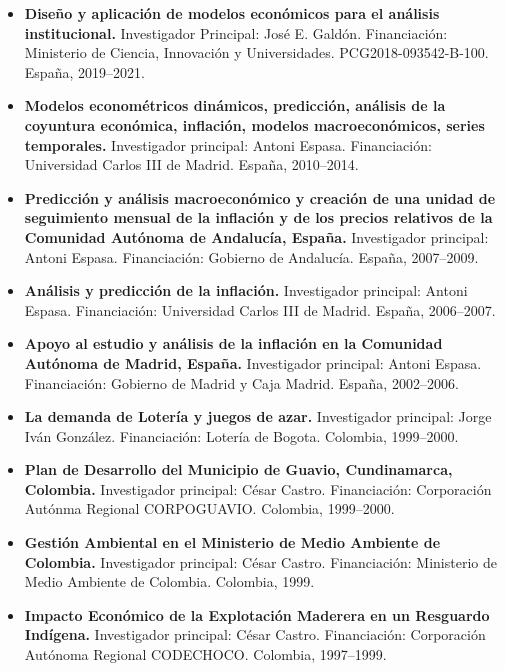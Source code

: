 \documentclass[11pt]{article}\usepackage[]{graphicx}\usepackage[]{color}
\begin{document}
\begin{itemize}
  \item \textbf{Diseño y aplicación de modelos económicos para el análisis institucional.} Investigador Principal: José E. Galdón. Financiación: Ministerio de Ciencia, Innovación y Universidades. PCG2018-093542-B-100. España, 2019--2021.
  
\item \textbf{Modelos econométricos dinámicos, predicción, análisis de la
coyuntura económica, inflación, modelos macroeconómicos, series temporales.} Investigador principal: Antoni Espasa. Financiación: Universidad Carlos III de Madrid. España, 2010--2014.

\item \textbf{Predicción y análisis macroeconómico y creación de una unidad de seguimiento mensual de la inflación y de los precios relativos de la Comunidad Autónoma de Andalucía, España.} Investigador principal: Antoni Espasa. Financiación: Gobierno de Andalucía. España, 2007--2009.

\item \textbf{Análisis y predicción de la inflación.} Investigador principal: Antoni Espasa. Financiación: Universidad Carlos III de Madrid. España, 2006--2007.

\item \textbf{Apoyo al estudio y análisis de la inflación en la Comunidad 
Autónoma de Madrid, España.} Investigador principal: Antoni Espasa. Financiación: Gobierno de Madrid y Caja Madrid. España, 2002--2006.

\item \textbf{La demanda de Lotería y juegos de azar.} Investigador principal: Jorge Iván González. Financiación: Lotería de Bogota. Colombia, 1999--2000.

\item \textbf{Plan de Desarrollo del Municipio de Guavio, Cundinamarca, Colombia.} Investigador principal: César Castro. Financiación: Corporación Autónma Regional CORPOGUAVIO. Colombia, 1999--2000.

\item \textbf{Gestión Ambiental en el Ministerio de Medio Ambiente de Colombia.} Investigador principal: César Castro. Financiación: Ministerio de Medio Ambiente de Colombia. Colombia, 1999.

\item \textbf{Impacto Económico de la Explotación Maderera en un Resguardo Indígena.} Investigador principal: César Castro. Financiación: Corporación Autónoma Regional CODECHOCO. Colombia, 1997--1999.

\end{itemize}
\end{document}

